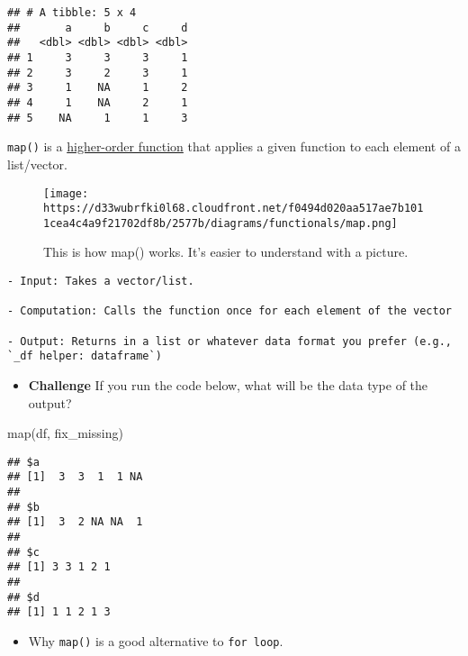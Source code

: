 \documentclass[
]{book}
\newenvironment{Shaded}{\begin{snugshade}}{\end{snugshade}}
\newcommand{\FunctionTok}[1]{\textcolor[rgb]{0.00,0.00,0.00}{#1}}
\newcommand{\NormalTok}[1]{#1}
\providecommand{\tightlist}{%
  \setlength{\itemsep}{0pt}\setlength{\parskip}{0pt}}
\begin{document}
\begin{verbatim}
## # A tibble: 5 x 4
##       a     b     c     d
##   <dbl> <dbl> <dbl> <dbl>
## 1     3     3     3     1
## 2     3     2     3     1
## 3     1    NA     1     2
## 4     1    NA     2     1
## 5    NA     1     1     3
\end{verbatim}

\texttt{map()} is a \href{https://en.wikipedia.org/wiki/Map_(higher-order_function)}{higher-order function} that applies a given function to each element of a list/vector.

\begin{figure}
\centering
\texttt{[image: https://d33wubrfki0l68.cloudfront.net/f0494d020aa517ae7b1011cea4c4a9f21702df8b/2577b/diagrams/functionals/map.png]}
\caption{This is how map() works. It's easier to understand with a picture.}
\end{figure}

\begin{verbatim}
- Input: Takes a vector/list. 

- Computation: Calls the function once for each element of the vector 

- Output: Returns in a list or whatever data format you prefer (e.g., `_df helper: dataframe`)
\end{verbatim}

\begin{itemize}
\tightlist
\item
  \textbf{Challenge} If you run the code below, what will be the data type of the output?
\end{itemize}

\begin{Shaded}
\begin{Highlighting}[]
\FunctionTok{map}\NormalTok{(df, fix\_missing)}
\end{Highlighting}
\end{Shaded}

\begin{verbatim}
## $a
## [1]  3  3  1  1 NA
## 
## $b
## [1]  3  2 NA NA  1
## 
## $c
## [1] 3 3 1 2 1
## 
## $d
## [1] 1 1 2 1 3
\end{verbatim}

\begin{itemize}
\tightlist
\item
  Why \texttt{map()} is a good alternative to \texttt{for\ loop}.
\end{itemize}
\end{document}

